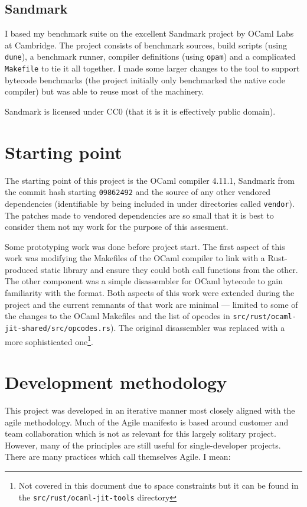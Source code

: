 \subsection{Sandmark}

I based my benchmark suite on the excellent Sandmark project by OCaml Labs at Cambridge. The
project consists of benchmark sources, build scripts (using \texttt{dune}), a benchmark runner,
compiler definitions (using \texttt{opam}) and a complicated \texttt{Makefile} to tie it all
together.  I made some larger changes to the tool to support bytecode benchmarks (the project
initially only benchmarked the native code compiler) but was able to reuse most of the machinery.

Sandmark is licensed under CC0 (that it is it is effectively public domain).

\section{Starting point}

The starting point of this project is the OCaml compiler 4.11.1, Sandmark from the commit hash
starting \texttt{09862492} and the source of any other vendored dependencies (identifiable by being
included in under directories called \texttt{vendor}). The patches made to vendored dependencies
are
so small that it is best to consider them not my work for the purpose of this assesment.

Some prototyping work was done before project start.  The first aspect of this work was modifying
the Makefiles of the OCaml compiler to link with a
Rust-produced static library and ensure they could both call functions from the other. The other
component was a simple disassembler for OCaml bytecode to gain familiarity with the format. Both
aspects of this work were extended during the project and the current remnants of that work are
minimal --- limited to some of the changes to the OCaml Makefiles and the list of opcodes in
\texttt{src/rust/ocaml-jit-shared/src/opcodes.rs}).  The original disassembler was replaced with a
more sophisticated one\footnote{Not covered in this document due to space constraints but it
    can be found in the \texttt{src/rust/ocaml-jit-tools} directory}.

\section{Development methodology}

This project was developed in an iterative manner most closely aligned with the agile
methodology. Much of the Agile manifesto is based around customer and team collaboration which is
not as relevant for this largely solitary project. However, many of the principles are still useful
for single-developer projects. There are many practices which call themselves Agile. I mean:

